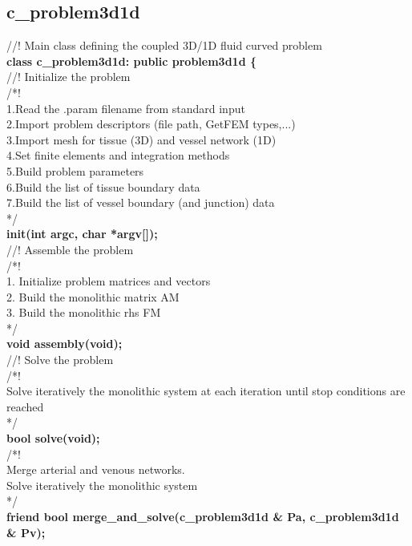 \documentclass[a4paper]{report}
\newcommand\tab[1][1cm]{\hspace*{#1}}
\begin{document}
\newpage
\subsection{c\_\-problem3d1d}
{\selectfont
//! Main class defining the coupled 3D/1D fluid curved problem\\

\textbf{class c\_\-problem3d1d: public problem3d1d \{}\\
//! Initialize the problem\\
/*!\\
\tab 1.Read the .param filename from standard input\\
\tab 2.Import problem descriptors (file path, GetFEM types,...)\\
\tab 3.Import mesh for tissue (3D) and vessel network (1D)\\
\tab 4.Set finite elements and integration methods\\
\tab 5.Build problem parameters\\
\tab 6.Build the list of tissue boundary data\\
\tab 7.Build the list of vessel boundary (and junction) data\\
*/	 \\
\textbf{init(int argc, char *argv[]);}\\
//! Assemble the problem\\
/*!\\
\tab 1. Initialize problem matrices and vectors\\
\tab 2. Build the monolithic matrix AM\\
\tab 3. Build the monolithic rhs FM\\
*/\\
\textbf{void assembly(void);}\\
//! Solve the problem\\
/*!	\\
\tab Solve iteratively the monolithic system at each iteration until stop conditions are reached\\
*/\\
\textbf{bool solve(void);}\\
/*!\\
\tab Merge arterial and venous networks.\\
\tab Solve iteratively the monolithic system\\
*/\\
\textbf{friend bool merge\_\-and\_\-solve(c\_\-problem3d1d \& Pa, c\_\-problem3d1d \& Pv);}\\
}
\end{document}
